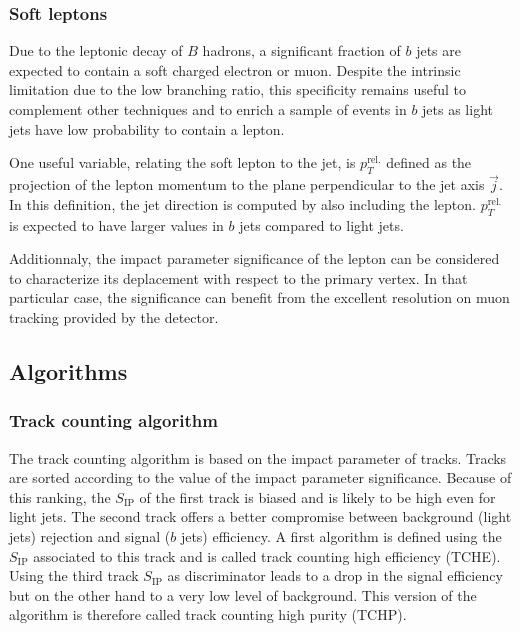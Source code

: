 
    \subsubsection{Soft leptons}

    Due to the leptonic decay of $B$ hadrons, a significant fraction of $b$ jets are
    expected to contain a soft charged electron or muon. Despite the intrinsic limitation
    due to the low branching ratio, this specificity remains useful to complement other
    techniques and to enrich a sample of events in $b$ jets as light jets have low probability
    to contain a lepton.

    One useful variable, relating the soft lepton to the jet, is $p_T^\text{rel.}$ defined
    as the projection of the lepton momentum to the plane perpendicular to the jet axis
    $\vec{j}$. In this definition, the jet direction is computed by also including the lepton.
    $p_T^\text{rel.}$ is expected to have larger values in $b$ jets compared to light jets.

    Additionnaly, the impact parameter significance of the lepton can be considered to
    characterize its deplacement with respect to the primary vertex. In that particular
    case, the significance can benefit from the excellent resolution on muon tracking
    provided by the detector.


    \subsection{Algorithms}


        \subsubsection{Track counting algorithm}

    The track counting algorithm is based on the impact parameter of tracks. Tracks are
    sorted according to the value of the impact parameter significance. Because of this
    ranking, the $S_\text{IP}$ of the first track is biased and is likely to be high even
    for light jets. The second track offers a better compromise between background (light
    jets) rejection and signal ($b$ jets) efficiency. A first algorithm is defined using
    the $S_\text{IP}$ associated to this track and is called track counting high efficiency
    (TCHE). Using the third track $S_\text{IP}$ as discriminator leads to a drop in the
    signal efficiency but on the other hand to a very low level of background. This
    version of the algorithm is therefore called track counting high purity (TCHP).

